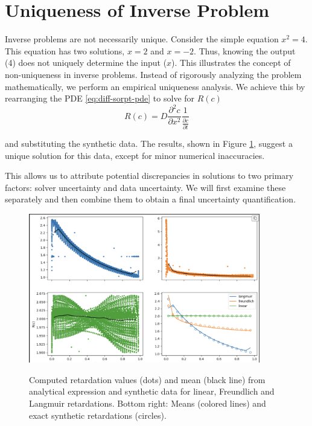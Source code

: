 \documentclass{article}
\begin{document}
\section{Uniqueness of Inverse Problem}
\label{sec:uniqueness}
Inverse problems are not necessarily unique. Consider the simple equation $x^2 = 4$. This equation has two solutions, $x=2$ and $x=-2$. Thus, knowing the output (4) does not uniquely determine the input ($x$). This illustrates the concept of non-uniqueness in inverse problems. Instead of rigorously analyzing the problem mathematically, we perform an empirical uniqueness analysis. We achieve this by rearranging the PDE \eqref{eq:diff-sorpt-pde} to solve for $R(c)$
\begin{equation*}
    R(c) = D \frac{\partial^2 c}{\partial x^2} \frac{1}{\frac{\partial c}{\partial t}}
\end{equation*}

and substituting the synthetic data. The results, shown in Figure \ref{fig:ret_uniqueness}, suggest a unique solution for this data, except for minor numerical inaccuracies.

This allows us to attribute potential discrepancies in solutions to two primary factors: solver uncertainty and data uncertainty. We will first examine these separately and then combine them to obtain a final uncertainty quantification.


\begin{figure}
    \centering
    \includegraphics[width=0.9\textwidth]{figs/ret_uniqueness.png}
    \label{fig:ret_uniqueness}
    \caption{Computed retardation values (dots) and mean (black line) from analytical expression and synthetic data for linear, Freundlich and Langmuir retardations. Bottom right: Means (colored lines) and exact synthetic retardations (circles).}
\end{figure}
\end{document}
